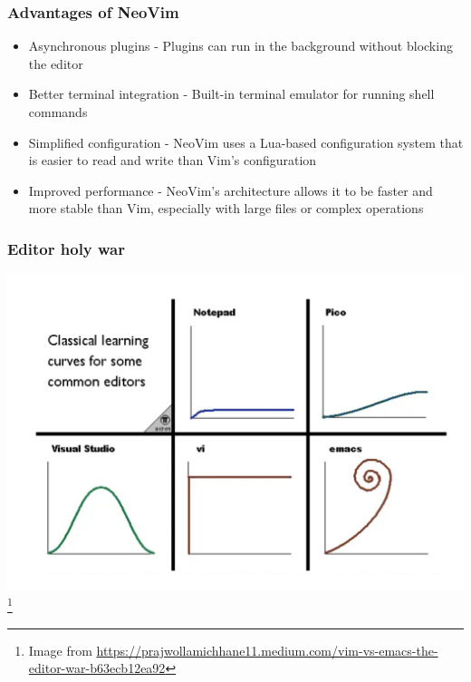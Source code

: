 \documentclass[9pt,table,xcolor=dvipsnames]{beamer}%
\theoremstyle{definition}
\theoremstyle{plain}
\begin{document}
\begin{frame}
  \frametitle{Advantages of NeoVim}
  \begin{itemize}
    \item Asynchronous plugins - Plugins can run in the background without blocking the editor
    \item Better terminal integration - Built-in terminal emulator for running shell commands
    \item Simplified configuration - NeoVim uses a Lua-based configuration system that is easier to read and write than Vim's configuration
    \item Improved performance - NeoVim's architecture allows it to be faster and more stable than Vim, especially with large files or complex operations
  \end{itemize}
\end{frame}
\begin{frame}[fragile] %
  \frametitle{Editor holy war}
  \includegraphics[scale=0.20]{./figs/Learning_Curve.png}\footnote{Image from \url{https://prajwollamichhane11.medium.com/vim-vs-emacs-the-editor-war-b63ecb12ea92}}
\end{frame}
\end{document}
